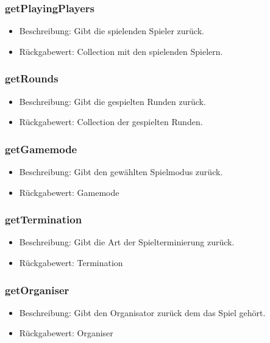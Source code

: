 \documentclass[a4paper]{scrreprt}
\begin{document}
    \subsubsection{getPlayingPlayers}
    \begin{itemize}
        \item Beschreibung: Gibt die spielenden Spieler zurück.
        \item Rückgabewert: Collection mit den spielenden Spielern.
    \end{itemize}

    \subsubsection{getRounds}
    \begin{itemize}
        \item Beschreibung: Gibt die gespielten Runden zurück.
        \item Rückgabewert: Collection der gespielten Runden.
    \end{itemize}

    \subsubsection{getGamemode}
    \begin{itemize}
        \item Beschreibung: Gibt den gewählten Spielmodus zurück.
        \item Rückgabewert: Gamemode
    \end{itemize}

    \subsubsection{getTermination}
    \begin{itemize}
        \item Beschreibung: Gibt die Art der Spielterminierung zurück.
        \item Rückgabewert: Termination
    \end{itemize}

    \subsubsection{getOrganiser}
    \begin{itemize}
        \item Beschreibung: Gibt den Organisator zurück dem das Spiel gehört.
        \item Rückgabewert: Organiser
    \end{itemize}
\end{document}
